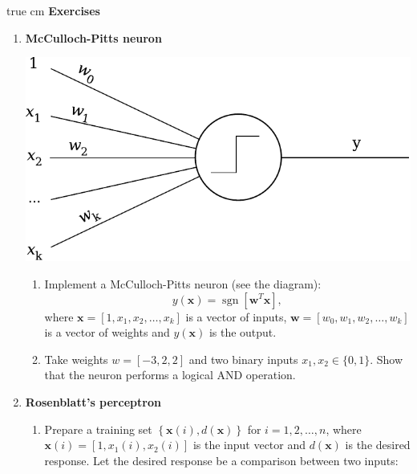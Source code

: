 \documentclass[12pt, a4]{article}
\DeclareMathOperator\sgn{sgn}
\begin{document}
 true cm
{\bf Exercises}
\begin{enumerate}
    \item \textbf{McCulloch-Pitts neuron}

        \begin{center}
               \includegraphics[scale=0.5]{perceptron.pdf}
        \end{center}
        \begin{enumerate}
            \item Implement a McCulloch-Pitts neuron (see the
                diagram):
                \begin{equation*}
                    y(\mathbf{x})=\sgn\left[
                    \mathbf{w}^T\mathbf{x}\right],
                \end{equation*}
                where $\mathbf{x}=[1, x_1, x_2,\dots, x_k]$ is a
                vector of inputs, $\mathbf{w}=[w_0, w_1, w_2, \dots,
                w_k]$ is a vector of weights and $y(\mathbf{x})$ is the
                output.
            \item Take weights $w=[-3, 2, 2]$ and two binary inputs
                $x_1, x_2 \in \{0, 1\}$. Show that the neuron performs a
            logical AND operation.
        \end{enumerate}
    \item \textbf{Rosenblatt's perceptron}
        \begin{enumerate}
            \item Prepare a training set $\left\{\mathbf{x}(i),
                d(\mathbf{x})\right\}$ for $i=1,2,\dots,n$, where
                $\mathbf{x}(i)=[1, x_1(i), x_2(i)]$ is the input
                vector and $d(\mathbf{x})$ is the desired response. Let the
                desired response be a comparison between two inputs:


\end{enumerate}
\end{enumerate}
\end{document}
